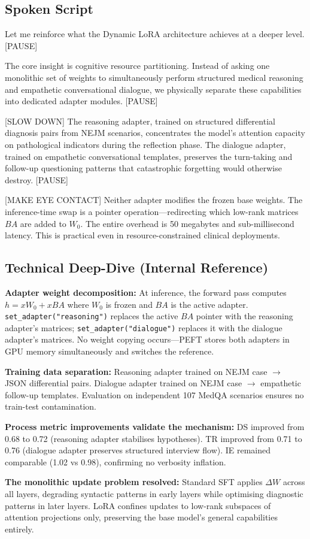 \documentclass[12pt]{article}
\begin{document}
  \subsection*{Spoken Script}
  \begin{spokenbox}
   Let me reinforce what the Dynamic LoRA architecture achieves at a deeper level. [PAUSE]

  The core insight is cognitive resource partitioning. Instead of asking one monolithic set of weights to simultaneously perform structured medical reasoning and empathetic conversational dialogue, we physically separate these capabilities into dedicated adapter modules. [PAUSE]

  [SLOW DOWN] The reasoning adapter, trained on structured differential diagnosis pairs from NEJM scenarios, concentrates the model's attention capacity on pathological indicators during the reflection phase. The dialogue adapter, trained on empathetic conversational templates, preserves the turn-taking and follow-up questioning patterns that catastrophic forgetting would otherwise destroy. [PAUSE]

  [MAKE EYE CONTACT] Neither adapter modifies the frozen base weights. The inference-time swap is a pointer operation---redirecting which low-rank matrices $BA$ are added to $W_0$. The entire overhead is 50 megabytes and sub-millisecond latency. This is practical even in resource-constrained clinical deployments.
  \end{spokenbox}

  \subsection*{Technical Deep-Dive (Internal Reference)}
  {\color{techgray}
  \textbf{Adapter weight decomposition:} At inference, the forward pass computes $h = xW_0 + xBA$ where $W_0$ is frozen and $BA$ is the active adapter. \texttt{set\_adapter("reasoning")} replaces the active $BA$ pointer with the reasoning adapter's matrices; \texttt{set\_adapter("dialogue")} replaces it with the dialogue adapter's matrices. No weight copying occurs---PEFT stores both adapters in GPU memory simultaneously and switches the reference.

  \textbf{Training data separation:} Reasoning adapter trained on NEJM case $\to$ JSON differential pairs. Dialogue adapter trained on NEJM case $\to$ empathetic follow-up templates. Evaluation on independent 107 MedQA scenarios ensures no train-test contamination.

  \textbf{Process metric improvements validate the mechanism:} DS improved from 0.68 to 0.72 (reasoning adapter stabilises hypotheses). TR improved from 0.71 to 0.76 (dialogue adapter preserves structured interview flow). IE remained comparable (1.02 vs 0.98), confirming no verbosity inflation.

  \textbf{The monolithic update problem resolved:} Standard SFT applies $\Delta W$ across all layers, degrading syntactic patterns in early layers while optimising diagnostic patterns in later layers. LoRA confines updates to low-rank subspaces of attention projections only, preserving the base model's general capabilities entirely.
  }
\end{document}
